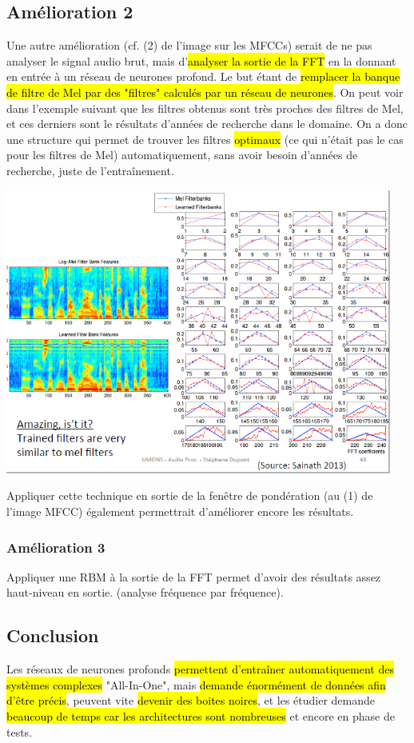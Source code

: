 \documentclass[letterpaper, 12pt]{article}
\newcommand{\alinea}{
\hspace*{0.5cm}}
\begin{document}
			\subsection{Amélioration 2}
				\alinea Une autre amélioration (cf. (2) de l'image sur les MFCCs) serait de ne pas analyser le signal audio 
					brut, mais d'\hl{analyser la sortie de la FFT} en la donnant en entrée à un réseau de neurones profond.
					Le but étant de \hl{remplacer la banque de filtre de Mel par des "filtres" calculés par un réseau de neurones}.
					On peut voir dans l'exemple suivant que les filtres obtenus sont très proches des filtres de Mel, et ces 
					derniers sont le résultats d'années de recherche dans le domaine. On a donc une structure qui permet de trouver
					les filtres \hl{optimaux} (ce qui n'était pas le cas pour les filtres de Mel) automatiquement, sans avoir 
					besoin d'années de recherche, juste de l'entraînement.
				\begin{center}
					\includegraphics[width=5in]{Images/mel}
				\end{center}
				\alinea Appliquer cette technique en sortie de la fenêtre de pondération (au (1) de l'image MFCC) également 
					permettrait d'améliorer encore les résultats.
			\subsubsection{Amélioration 3}
				\alinea Appliquer une RBM à la sortie de la FFT permet d'avoir des résultats assez haut-niveau en sortie. 
					(analyse fréquence par fréquence).
		\subsection{Conclusion}
			\alinea Les réseaux de neurones profonds \hl{permettent d'entraîner automatiquement des systèmes complexes} "All-In-One", 
				mais \hl{demande énormément de données afin d'être précis}, peuvent vite \hl{devenir des boites noires}, et les étudier 
				demande \hl{beaucoup de temps car les architectures sont nombreuses} et encore en phase de tests.
%
\pagebreak
%
\end{document}
